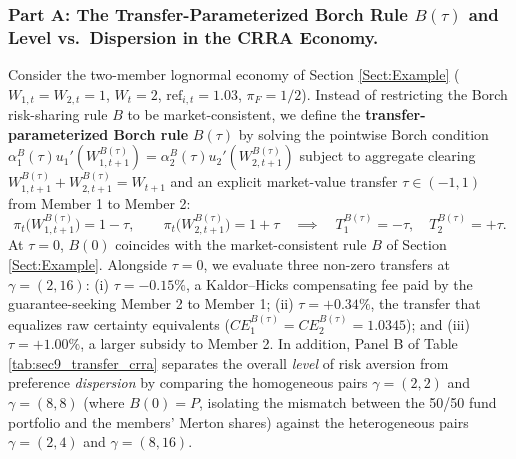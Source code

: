 \subsubsection*{Part A: The Transfer-Parameterized Borch Rule $B(\tau)$ and Level vs.\ Dispersion in the CRRA Economy.}
Consider the two-member lognormal economy of Section \ref{Sect:Example} ($W_{1,t} = W_{2,t} = 1$, $W_t = 2$, $\text{ref}_{i,t} = 1.03$, $\pi_F = 1/2$). Instead of restricting the Borch risk-sharing rule $B$ to be market-consistent, we define the \textbf{transfer-parameterized Borch rule} $B(\tau)$ by solving the pointwise Borch condition $\alpha_1^B(\tau) u_1'(W_{1,t+1}^{B(\tau)}) = \alpha_2^B(\tau) u_2'(W_{2,t+1}^{B(\tau)})$ subject to aggregate clearing $W_{1,t+1}^{B(\tau)} + W_{2,t+1}^{B(\tau)} = W_{t+1}$ and an explicit market-value transfer $\tau \in (-1, 1)$ from Member 1 to Member 2:
\begin{equation}
    \pi_t\big(W_{1,t+1}^{B(\tau)}\big) = 1 - \tau, \qquad \pi_t\big(W_{2,t+1}^{B(\tau)}\big) = 1 + \tau \quad \implies \quad T_1^{B(\tau)} = -\tau, \quad T_2^{B(\tau)} = +\tau.
    \label{eq:B_tau_def}
\end{equation}
At $\tau = 0$, $B(0)$ coincides with the market-consistent rule $B$ of Section \ref{Sect:Example}. Alongside $\tau = 0$, we evaluate three non-zero transfers at $\gamma = (2, 16)$: (i) $\tau = -0.15\%$, a Kaldor--Hicks compensating fee paid by the guarantee-seeking Member 2 to Member 1; (ii) $\tau = +0.34\%$, the transfer that equalizes raw certainty equivalents ($CE_1^{B(\tau)} = CE_2^{B(\tau)} = 1.0345$); and (iii) $\tau = +1.00\%$, a larger subsidy to Member 2. In addition, Panel B of Table \ref{tab:sec9_transfer_crra} separates the overall \emph{level} of risk aversion from preference \emph{dispersion} by comparing the homogeneous pairs $\gamma = (2, 2)$ and $\gamma = (8, 8)$ (where $B(0) = P$, isolating the mismatch between the 50/50 fund portfolio and the members' Merton shares) against the heterogeneous pairs $\gamma = (2, 4)$ and $\gamma = (8, 16)$.
